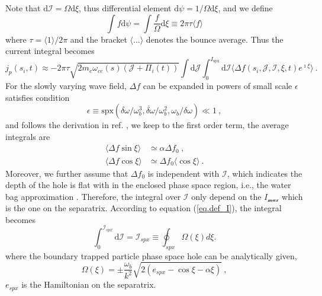 Note that $\mathrm{d}\mathcal{I} = \Omega \mathrm{d}\xi$, thus differential element $\mathrm{d}\psi = 1/\Omega \mathrm{d}\xi$, and we define
\begin{equation}
      \int f \mathrm{d}\psi = \int \frac{f}{\Omega}\mathrm{d}\xi \equiv {2\pi \tau} \langle f \rangle
\end{equation}
where $\tau = \langle 1 \rangle/2\pi$ and the bracket $\langle ... \rangle$ denotes the bounce average.
Thus the current integral becomes
\begin{equation}
    j_p(s_i,t) \approx -  {2\pi \tau} \sqrt{2m_e\omega_{ce}(s)(\mathcal{J} + \Pi_i(t))}\int\mathrm{d} \mathcal{J} \int_0^{I_{\mathrm{s p x}}}\mathrm{d}\mathcal{I}  \langle \Delta f(s_i,\mathcal{J},\mathcal{I},\xi,t)e^{\imath \xi} \rangle  ~.
\end{equation}
For the slowly varying wave field, $\Delta f$ can be expanded in powers of small scale $\epsilon$ satisfies condition \cite{berk1999}
\begin{equation}
    \epsilon \equiv \mathrm{s p x}\left(\ddot{\delta \omega}/\omega_b^3, \dot{\delta \omega}/\omega_b^2, \omega_b/\delta \omega \right) \ll 1~,
\end{equation}
and follows the derivation in ref. \cite{berk1999}, we keep to the first order term, the average integrals are
\begin{equation}
    \begin{aligned}
    \langle\Delta f \sin \xi \rangle &\simeq \alpha \Delta f_0 ~, \\ 
    \langle \Delta f \cos \xi \rangle &\simeq  \Delta f_0 \langle \cos \xi \rangle ~.
    \end{aligned}
\end{equation}
Moreover, we further assume that $\Delta f_0$ is independent with $\mathcal{I}$, which indicates the depth of the hole is flat with in the enclosed phase space region, i.e., the water bag approximation \cite{omura_theory_2008,hezaveh2021}. Therefore, the integral over $\mathcal{I}$ only depend on the $I_\mathcal{max}$ which is the one on the separatrix. 
According to equation (\ref{eq.def_I}), the integral becomes
\begin{equation}
    \int^{\mathcal{I}_{s p x}}_0 \mathrm{d}\mathcal{I} = \mathcal{I}_{s p x} \equiv \oint_{s p x} \Omega (\xi) d \xi.
\end{equation}
where the boundary trapped particle phase space hole can be analytically given,
\begin{equation}
    \Omega(\xi) = \pm \frac{\omega_b}{k^2} \sqrt{2 (e_{spx}-\cos \xi - \alpha \xi)}~,
\end{equation}
$e_{spx}$ is the Hamiltonian on the separatrix.

